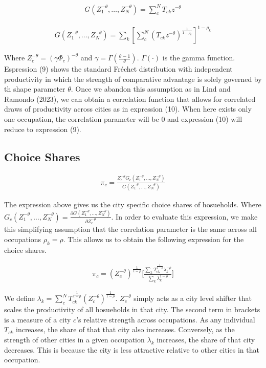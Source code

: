 \documentclass[10pt]{article}
\begin{document}
\begin{align}
    G(Z_1^{- \theta}, \dots, Z_N^{- \theta}) = \sum_{c}^{N} T_{ck} z^{- \theta}
\end{align}

\begin{align}
    G(Z_1^{- \theta}, \dots, Z_N^{- \theta}) = \sum_{k}^{} \left[ \sum_{c}^{N} (T_{ck} z^{- \theta})^{\frac{1}{1 - \rho_k}} \right]^{1 - \rho_k}
\end{align}

Where $Z_c^{- \theta} = (\gamma \Phi_c)^{- \theta}$ and $\gamma = \Gamma \left( \frac{\theta - 1}{\theta} \right)$. $\Gamma(\cdot)$ is the gamma function. Espression (9) shows the standard Fr\'{e}chet distribution with independent productivity in which the strength of comparative advantage is solely governed by th shape parameter $\theta$. Once we abandon this assumption as in Lind and Ramondo (2023), we can obtain a correlation function that allows for correlated draws of productivity across cities as in expression (10). When here exists only one occupation, the correlation parameter will be 0 and expression (10) will reduce to expression (9).

\subsection{Choice Shares}

\begin{align}
    \pi_c = \frac{Z_c^{- \theta} G_c(Z_1^{- \theta}, \dots, Z_N^{- \theta})}{G(Z_1^{- \theta}, \dots, Z_N^{- \theta})}
\end{align}

The expression above gives us the city specific choice shares of hosueholds. Where $G_c(Z_1^{- \theta}, \dots, Z_N^{- \theta}) = \frac{\partial G(Z_1^{- \theta}, \dots, Z_N^{- \theta})}{\partial Z_c^{- \theta}}$. In order to evaluate this expression, we make this simplifying assumption that the correlation parameter is the same across all occupations $\rho_k = \rho$. This allows us to obtain the following expression for the choice shares.

\begin{align}
    \pi_{c} = (Z_{c}^{-\theta})^{\frac{1}{1-\rho}}\Bigg[\frac{\sum\limits_{k}{T^{\frac{1}{1-\rho}}_{ck}}\lambda_{k}^{-\rho}}{\sum\limits_{k}\lambda_{k}^{1-\rho}}\Bigg]
\end{align}

We define $\lambda_k = \sum\limits_{c}^{N}{T^{\frac{1}{1-\rho}}_{ck}}(Z_{c}^{-\theta})^{\frac{1}{1-\rho}}$. $Z_c^{- \theta}$ simply acts as a city level shifter that scales the productivity of all hosueholds in that city. The second term in brackets is a measure of a city $c$'s relative strength across occupations. As any individual $T_{ck}$ increases, the share of that that city also increases. Conversely, as the strength of other cities in a given occupation $\lambda_k$ increases, the share of that city decreases. This is because the city is less attractive relative to other cities in that occupation.
\end{document}
